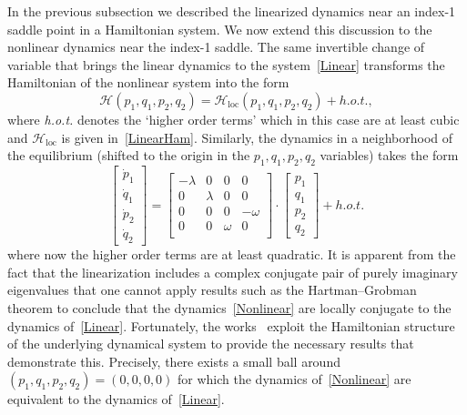 \documentclass[11pt]{article}
\numberwithin{equation}{section}
\theoremstyle{plain}
\begin{document}
In the previous subsection we described the linearized dynamics near an index-1 saddle point in a Hamiltonian system. We now extend this discussion to the nonlinear dynamics near the index-1 saddle. The same invertible change of variable that brings the linear dynamics to the system~\eqref{Linear} transforms the Hamiltonian of the nonlinear system into the form
\begin{equation}\label{LinearHam2}
	\mathcal{H}(p_1,q_1,p_2,q_2) = \mathcal{H}_\mathrm{loc}(p_1,q_1,p_2,q_2) + h.o.t.,
\end{equation}
where {\em h.o.t.} denotes the `higher order terms' which in this case are at least cubic and $\mathcal{H}_\mathrm{loc}$ is given in~\eqref{LinearHam}. Similarly, the dynamics in a neighborhood of the equilibrium (shifted to the origin in the $p_1,q_1,p_2,q_2$ variables) takes the form 
\begin{equation}\label{Nonlinear}
	\begin{bmatrix}
		\dot p_1 \\ \dot q_1 \\ \dot p_2 \\ \dot q_2
	\end{bmatrix} = \begin{bmatrix}
		-\lambda & 0 & 0 & 0 \\
		0 & \lambda & 0 & 0 \\
		0 & 0 & 0 & -\omega \\
		0 & 0 & \omega & 0 \\
	\end{bmatrix}\cdot\begin{bmatrix}
		p_1 \\ q_1 \\ p_2 \\ q_2
	\end{bmatrix} + h.o.t.
\end{equation} 
where now the higher order terms are at least quadratic. It is apparent from the fact that the linearization includes a complex conjugate pair of purely imaginary eigenvalues that one cannot apply results such as the Hartman--Grobman theorem to conclude that the dynamics~\eqref{Nonlinear} are locally conjugate to the dynamics of~\eqref{Linear}. Fortunately, the works~\cite{Moser,Wiggins} exploit the Hamiltonian structure of the underlying dynamical system to provide the necessary results that demonstrate this. Precisely, there exists a small ball around $(p_1,q_1,p_2,q_2) = (0,0,0,0)$ for which the dynamics of~\eqref{Nonlinear} are equivalent to the dynamics of~\eqref{Linear}. 
\end{document}
